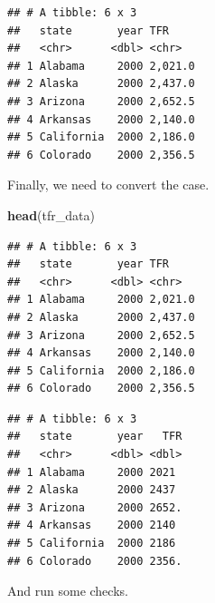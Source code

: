 \documentclass[
]{book}
\newenvironment{Shaded}{\begin{snugshade}}{\end{snugshade}}
\newcommand{\CommentTok}[1]{\textcolor[rgb]{0.56,0.35,0.01}{\textit{#1}}}
\newcommand{\DataTypeTok}[1]{\textcolor[rgb]{0.13,0.29,0.53}{#1}}
\newcommand{\KeywordTok}[1]{\textcolor[rgb]{0.13,0.29,0.53}{\textbf{#1}}}
\newcommand{\NormalTok}[1]{#1}
\newcommand{\OperatorTok}[1]{\textcolor[rgb]{0.81,0.36,0.00}{\textbf{#1}}}
\newcommand{\StringTok}[1]{\textcolor[rgb]{0.31,0.60,0.02}{#1}}
\begin{document}
\begin{verbatim}
## # A tibble: 6 x 3
##   state       year TFR    
##   <chr>      <dbl> <chr>  
## 1 Alabama     2000 2,021.0
## 2 Alaska      2000 2,437.0
## 3 Arizona     2000 2,652.5
## 4 Arkansas    2000 2,140.0
## 5 California  2000 2,186.0
## 6 Colorado    2000 2,356.5
\end{verbatim}

Finally, we need to convert the case.

\begin{Shaded}
\begin{Highlighting}[]
\KeywordTok{head}\NormalTok{(tfr_data)}
\end{Highlighting}
\end{Shaded}

\begin{verbatim}
## # A tibble: 6 x 3
##   state       year TFR    
##   <chr>      <dbl> <chr>  
## 1 Alabama     2000 2,021.0
## 2 Alaska      2000 2,437.0
## 3 Arizona     2000 2,652.5
## 4 Arkansas    2000 2,140.0
## 5 California  2000 2,186.0
## 6 Colorado    2000 2,356.5
\end{verbatim}

\begin{Shaded}
\end{Shaded}

\begin{verbatim}
## # A tibble: 6 x 3
##   state       year   TFR
##   <chr>      <dbl> <dbl>
## 1 Alabama     2000 2021 
## 2 Alaska      2000 2437 
## 3 Arizona     2000 2652.
## 4 Arkansas    2000 2140 
## 5 California  2000 2186 
## 6 Colorado    2000 2356.
\end{verbatim}

And run some checks.

\begin{Shaded}
\end{Shaded}
\end{document}
